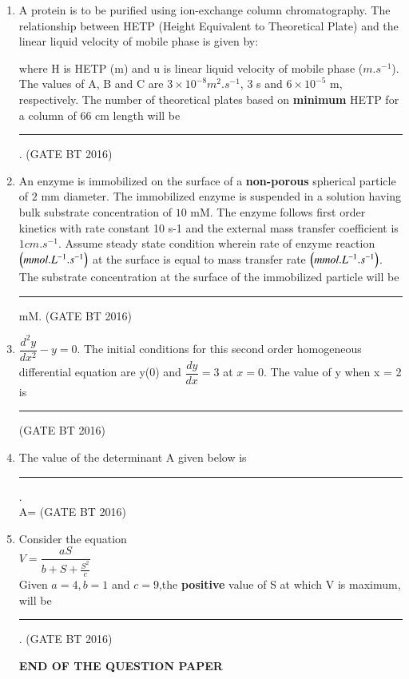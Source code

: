 \documentclass[journal,12pt,onecolumn]{IEEEtran}
\theoremstyle{remark}
\begin{document}
\begin{enumerate}
\item A protein is to be purified using ion-exchange column chromatography. The relationship between
HETP (Height Equivalent to Theoretical Plate) and the linear liquid velocity of mobile phase is
given by:

where H is HETP (m) and u is linear liquid velocity of mobile phase ($m.s^{-1}$). The values of A, B and
C are $3\times10^{-8} m^2.s^{-1}$, $3$ s and $6\times10^{-5}$ m, respectively. The number of theoretical plates based on \textbf{minimum} HETP for a column of $66$ cm length will be \rule{2cm}{0.4pt}. \hfill(GATE BT 2016) 

\item An enzyme is immobilized on the surface of a \textbf{non-porous} spherical particle of $2$ mm diameter. The
immobilized enzyme is suspended in a solution having bulk substrate concentration of $10$ mM. The
enzyme follows first order kinetics with rate constant 10 s-1 and the external mass transfer
coefficient is $1 cm.s^{-1}$. Assume steady state condition wherein rate of enzyme reaction $\left(mmol.L^{-1}.s^{-1}\right)$
at the surface is equal to mass transfer rate $\left(mmol.L^{-1}.s^{-1}\right)$. The substrate concentration at the surface
of the immobilized particle will be\rule{2cm}{0.4pt} mM. \hfill(GATE BT 2016) 

\item  $\dfrac{d^2y}{dx^2}-y=0$. The initial conditions for this second order homogeneous differential equation are y(0) and $\dfrac{dy}{dx}=3$ at $x=0$.
The value of y when x = 2 is\rule{2cm}{0.4pt} \hfill(GATE BT 2016) \\

\item The value of the determinant A given below is \rule{2cm}{0.4pt}.\\
A= \hfill(GATE BT 2016) 

\item Consider the equation\\ $V=\dfrac{aS}{b+S+\frac{S^2}{c}}$
\\Given $a=4,b=1$ and $c=9$,the \textbf{positive} value of S at which V is maximum, will be \rule{2cm}{0.4pt}. \hfill(GATE BT 2016) 

\centering
\textbf{END OF THE QUESTION PAPER}
\end{enumerate}
\end{document}
